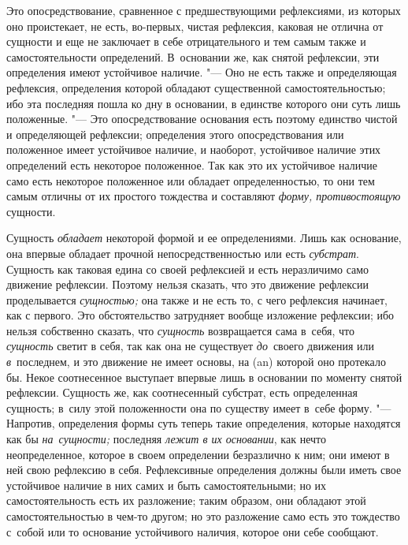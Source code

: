 Это опосредствование, сравненное с предшествующими рефлексиями, из которых оно
проистекает, не есть, во-первых, чистая рефлексия, каковая не отлична от
сущности и еще не заключает в себе отрицательного и тем самым также и
самостоятельности определений. В~основании же, как снятой рефлексии, эти
определения имеют устойчивое наличие. "--- Оно не есть также и определяющая
рефлексия, определения которой обладают существенной самостоятельностью; ибо
эта последняя пошла ко дну в основании, в единстве которого они суть лишь
положенные. "--- Это опосредствование основания есть поэтому единство чистой и
определяющей рефлексии; определения этого опосредствования или положенное имеет
устойчивое наличие, и наоборот, устойчивое наличие этих определений есть
некоторое положенное. Так как это их устойчивое наличие само есть некоторое
положенное или обладает определенностью, то они тем самым отличны от их
простого тождества и составляют {\em форму, противостоящую} сущности.

Сущность {\em обладает} некоторой формой и ее определениями. Лишь как
основание, она впервые обладает прочной непосредственностью или есть
{\em субстрат}. Сущность как таковая едина со своей рефлексией и есть
неразличимо само движение рефлексии. Поэтому нельзя сказать, что это движение
рефлексии проделывается {\em сущностью;} она также и не есть то, с чего
рефлексия начинает, как с первого. Это обстоятельство затрудняет вообще
изложение рефлексии; ибо нельзя собственно сказать, что {\em сущность}
возвращается сама в~себя, что {\em сущность} светит в себя, так как она не
существует {\em до}~своего движения или {\em в}~последнем, и это движение не
имеет основы, на (an) которой оно протекало бы. Некое соотнесенное выступает
впервые лишь в основании по моменту снятой рефлексии. Сущность же, как
соотнесенный субстрат, есть определенная сущность; в~силу этой положенности она
по существу имеет в~себе форму. "--- Напротив, определения формы суть теперь
такие определения, которые находятся как бы {\em на~сущности;} последняя
{\em лежит в их основании}, как нечто неопределенное, которое в своем
определении безразлично к ним; они имеют в ней свою рефлексию в себя.
Рефлексивные определения должны были иметь свое устойчивое наличие в них самих
и быть самостоятельными; но их самостоятельность есть их разложение; таким
образом, они обладают этой самостоятельностью в чем-то другом; но это
разложение само есть это тождество с~собой или то основание устойчивого
наличия, которое они себе сообщают.

